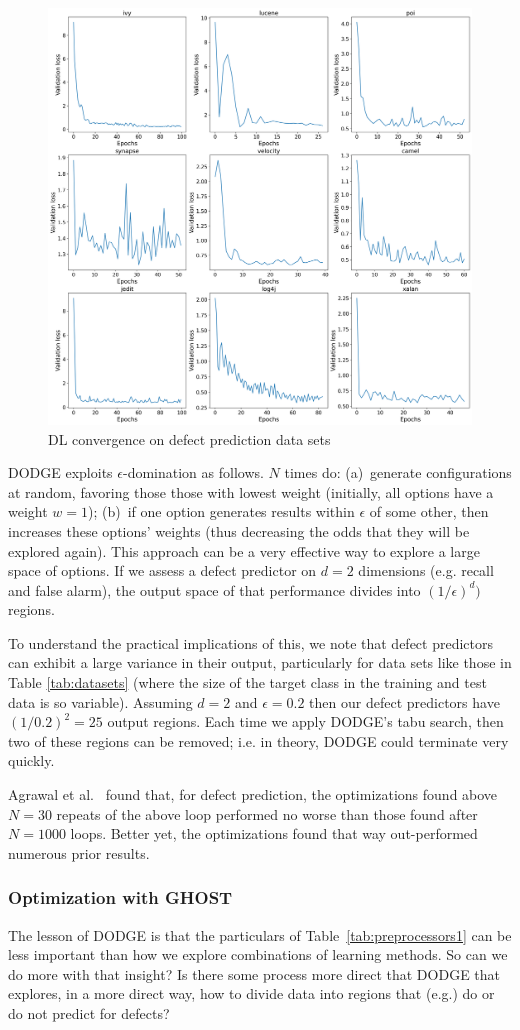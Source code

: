 \documentclass[10pt,compsoc,twocolumn]{IEEEtran}
\begin{document}
 

\begin{figure}
    \includegraphics[width=.49\textwidth]{convergence.png}
    \caption{DL convergence on defect prediction data sets}
    \label{fig:convergence}
\end{figure}
DODGE  exploits   $\epsilon$-domination as follows. $N$ times do: (a)~generate configurations   at random, favoring those those with lowest weight (initially, all options have a weight $w=1$); (b)~if one option generates results within $\epsilon$ of some other, then   increases these options' weights (thus  decreasing the odds that they will be explored again).
This approach can be a very effective way to explore a large space 
of options.
If we assess a defect predictor  on $d=2$
dimensions (e.g. recall and false alarm), the output space of that performance divides into $(1/\epsilon)^d)$ regions.

To understand the practical implications of this,
we note that
defect predictors can exhibit a large variance
in their output, particularly for data sets like
those in Table \ref{tab:datasets} (where the size of the target class in the training and test
data  is so variable).
 Assuming  $d=2$ and $\epsilon=0.2$ then 
 our defect predictors have
$(1/0.2)^2=25$ output regions. 
Each time we apply
DODGE's tabu search, then two of these regions can  be removed; i.e. in theory, DODGE could terminate very quickly.

Agrawal et al.~\cite{agrawal2019dodge}  found that, for defect prediction,
 the optimizations found above $N=30$ repeats of
the above loop performed no worse than those found after $N=1000$ loops. Better yet, the optimizations found that way
out-performed numerous prior results.

\subsubsection{Optimization with GHOST}
The lesson of DODGE is that the particulars
of Table~\ref{tab:preprocessors1} can be
less important than how we explore combinations
of learning methods.   So can we do more with
that insight? Is there some process more
direct that DODGE that explores, in a
more direct way, how to divide data
into regions that (e.g.) do or do not
predict for defects?
\end{document}
